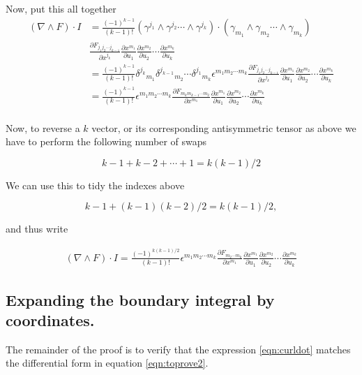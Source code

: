 \documentclass{article}
\newcommand{\grad}[0]{\nabla}
\newcommand{\PD}[2]{\frac{\partial {#2}}{\partial {#1}}}
\begin{document}
Now, put this all together
\begin{align*}
(\grad \wedge F ) \cdot I
&= \frac{(-1)^{k-1}}{(k-1)!} 
\left( \gamma^{j_1} \wedge \gamma^{j_2} \cdots \wedge \gamma^{j_{k}} \right) \cdot
\left( \gamma_{m_1} \wedge \gamma_{m_2} \cdots \wedge \gamma_{m_{k}} \right) \\
&\PD{x^{j_{k}}}{F_{j_1 j_2 \cdots j_{k-1}}}
\PD{u_1}{x^{m_1}} \PD{u_2}{x^{m_2}} \cdots \PD{u_k}{x^{m_k}} \\
&= \frac{(-1)^{k-1}}{(k-1)!} 
{\delta^{j_k}}_{m_1}
{\delta^{j_{k-1}}}_{m_2}
\cdots
{\delta^{j_{1}}}_{m_k}
\epsilon^{m_1 m_2 \cdots m_k}
\PD{x^{j_{k}}}{F_{j_1 j_2 \cdots j_{k-1}}}
\PD{u_1}{x^{m_1}} \PD{u_2}{x^{m_2}} \cdots \PD{u_k}{x^{m_k}} \\
&= \frac{(-1)^{k-1}}{(k-1)!} 
\epsilon^{m_1 m_2 \cdots m_k}
\PD{x^{m_{1}}}{F_{m_k m_{k-1} \cdots m_{2}}}
\PD{u_1}{x^{m_1}} \PD{u_2}{x^{m_2}} \cdots \PD{u_k}{x^{m_k}} \\
\end{align*}

Now, to reverse a $k$ vector, or its corresponding antisymmetric tensor as above we have to perform the following number of swaps

\begin{equation*}
k-1 + k-2 + \cdots + 1 = k(k-1)/2
\end{equation*}

We can use this to tidy the indexes above 

\begin{equation*}
k-1 + (k-1)(k-2)/2
= k(k -1 )/2,
\end{equation*}

and thus write

\begin{align}\label{eqn:curldot}
(\grad \wedge F ) \cdot I
= \frac{(-1)^{k(k-1)/2}}{(k-1)!} 
\epsilon^{m_1 m_2 \cdots m_k}
\PD{x^{m_{1}}}{F_{m_2 \cdots m_{k}}}
\PD{u_1}{x^{m_1}} \PD{u_2}{x^{m_2}} \cdots \PD{u_k}{x^{m_k}}
\end{align}

\subsection{ Expanding the boundary integral by coordinates. }

The remainder of the proof is to verify that the expression \ref{eqn:curldot} matches the differential form in equation \ref{eqn:toprove2}.
\end{document}
